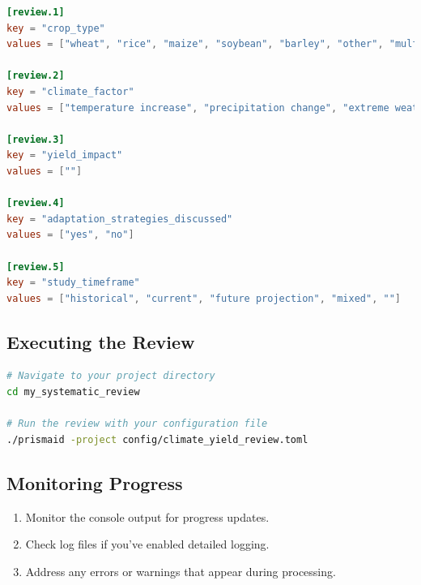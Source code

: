 \begin{configbox}
\begin{lstlisting}[language=TOML]
[review.1]
key = "crop_type"
values = ["wheat", "rice", "maize", "soybean", "barley", "other", "multiple", ""]

[review.2]
key = "climate_factor"
values = ["temperature increase", "precipitation change", "extreme weather", "CO2 levels", "multiple factors", "other", ""]

[review.3]
key = "yield_impact"
values = [""]

[review.4]
key = "adaptation_strategies_discussed"
values = ["yes", "no"]

[review.5]
key = "study_timeframe"
values = ["historical", "current", "future projection", "mixed", ""]
\end{lstlisting}
\end{configbox}

\subsection{Executing the Review}
\begin{commandbox}
\begin{lstlisting}[language=Bash]
# Navigate to your project directory
cd my_systematic_review

# Run the review with your configuration file
./prismaid -project config/climate_yield_review.toml
\end{lstlisting}
\end{commandbox}

\subsection{Monitoring Progress}

\begin{enumerate}
    \item Monitor the console output for progress updates.
    \item Check log files if you've enabled detailed logging.
    \item Address any errors or warnings that appear during processing.
\end{enumerate}

